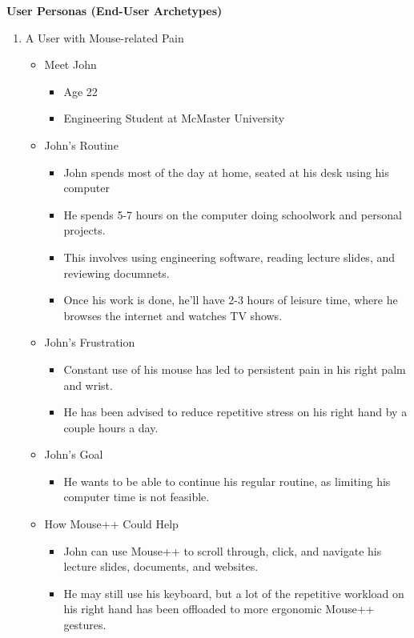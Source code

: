 \documentclass{article}
\begin{document}
\textbf{User Personas (End-User Archetypes)}
  \begin{enumerate}
    \item A User with Mouse-related Pain
    
    \begin{itemize}
      \item Meet John
      \begin{itemize}
        \item Age 22  
        \item Engineering Student at McMaster University
      \end{itemize}
      
      \item John's Routine
      \begin{itemize}
        \item John spends most of the day at home, seated at his desk using his computer
        \item He spends 5-7 hours on the computer doing schoolwork and personal projects. 
        \item This involves using engineering software, reading lecture slides, and reviewing documnets.
        \item Once his work is done, he'll have 2-3 hours of leisure time, where he browses the internet and watches TV shows.
      \end{itemize}

      \item John's Frustration
      \begin{itemize}
        \item Constant use of his mouse has led to persistent pain in his right palm and wrist.
        \item He has been advised to reduce repetitive stress on his right hand by a couple hours a day.
      \end{itemize}

      \item John's Goal
        \begin{itemize}
          \item He wants to be able to continue his regular routine, as limiting his computer time is not feasible.
        \end{itemize}
      
      \item How Mouse++ Could Help
      \begin{itemize}
        \item John can use Mouse++ to scroll through, click, and navigate his lecture slides, documents, and websites.
        \item He may still use his keyboard, but a lot of the repetitive workload on his right hand has been offloaded to more ergonomic Mouse++ gestures.
      \end{itemize}
    \end{itemize}


\end{enumerate}
\end{document}

